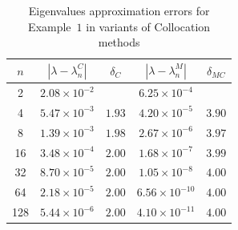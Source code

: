 \documentclass[]{interact}
\renewcommand{\arraystretch}{1.32}
\theoremstyle{plain}%
\theoremstyle{definition}
\theoremstyle{remark}
\begin{document}
\begin{table}[h!]
	\small
	\centering
	\setlength{\tabcolsep}{10pt}
	\renewcommand{\arraystretch}{1.2}
	\caption{Eigenvalues approximation errors for Example~$1$  in variants of Collocation methods}
	\label{table:01}
	\begin{tabular}{|c|c|c|c|c|}
		\hline
		$n$ & $|\lambda - \lambda_n^C|$ & $\delta_{C}$ & $|\lambda - \lambda_n^M|$ & $\delta_{MC}$  \\[3pt] 
		\hline
		2   & $2.08 \times 10^{-2}$ &            & $6.25 \times 10^{-4}$ &          \\[3pt] 
		4   & $5.47 \times 10^{-3}$ & $1.93$     & $4.20 \times 10^{-5}$ & $3.90$     \\[3pt] 
		8   & $1.39 \times 10^{-3}$ & $1.98$     & $2.67 \times 10^{-6}$ & $3.97$     \\[3pt] 
		16  & $3.48 \times 10^{-4}$ & $2.00$     & $1.68 \times 10^{-7}$ & $3.99$     \\[3pt] 
		32  & $8.70 \times 10^{-5}$ & $2.00$     & $1.05 \times 10^{-8}$ & $4.00$     \\[3pt] 
		64  & $2.18 \times 10^{-5}$ & $2.00$     & $6.56 \times 10^{-10}$ & $4.00$     \\[3pt]
		128  & $5.44 \times 10^{-6}$ & $2.00$     & $4.10 \times 10^{-11}$ & $4.00$     \\[3pt] 
		\hline
	\end{tabular}
\end{table}
\end{document}

